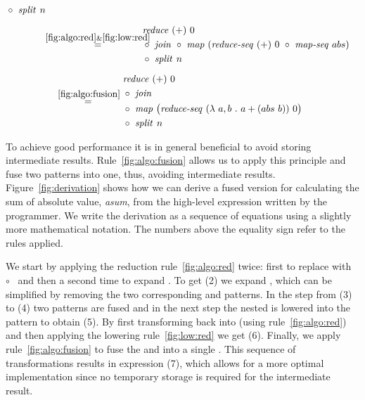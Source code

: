 \begin{figure*}[t]
\begin{align*}
\begin{aligned}
\begin{aligned}
        &\circ\ \MySplit\ n
      \end{aligned}\\[.5em]
  & \overset{\hspace{-1.3em}\ref{fig:algo:red}\& \ref{fig:low:red}\hspace{-1.1em}}{=\hspace{.2em}}
      \begin{aligned}
        & \Reduce\ (+)\ 0\\
        &\circ\ \MyJoin\ \circ\ \Map\ (\RedSeq\ (+)\ 0\ \circ\ \MapSeq\ abs)\\
        &\circ\ \MySplit\ n
      \end{aligned}\\[.5em]
  & \overset{\ref{fig:algo:fusion}}{=\hspace{.2em}}
      \begin{aligned}
        & \Reduce\ (+)\ 0\\
        &\circ\ \MyJoin\\
        &\circ\ \Map\ \big(\RedSeq\ (\lambda\ a, b\ .\ a+(abs\ b))\ 0\big)\\
        &\circ\ \MySplit\ n
      \end{aligned}
  \end{aligned}
\end{align*}
\caption{Derivation for \emph{asum}$(\vec{x})$ to a fused parallel version.
  The numbers above the equality sign refer to the rules from sections ....
}
\label{fig:derivation}
\end{figure*}




To achieve good performance it is in general beneficial to avoid storing intermediate results.
Rule~\ref{fig:algo:fusion} allows us to apply this principle and fuse two patterns into one, thus, avoiding intermediate results.
Figure~\ref{fig:derivation} shows how we can derive a fused version for calculating the sum of absolute value, \emph{asum}, from the high-level expression written by the programmer.
We write the derivation as a sequence of equations using a slightly more mathematical notation.
The numbers above the equality sign refer to the rules applied.

We start by applying the reduction rule~\ref{fig:algo:red} twice:
first to replace  with ~$\circ$~ and then a second time to expand .
To get (2) we expand , which can be simplified by removing the two corresponding  and  patterns.
In the step from (3) to (4) two  patterns are fused and in the next step the nested  is lowered into the  pattern to obtain (5).
By first transforming  back into  (using rule~\ref{fig:algo:red}) and then applying the lowering rule~\ref{fig:low:red} we get (6).
Finally, we apply rule~\ref{fig:algo:fusion} to fuse the  and  into a single .
This sequence of transformations results in expression (7), which allows for a more optimal implementation since no temporary storage is required for the intermediate result.




